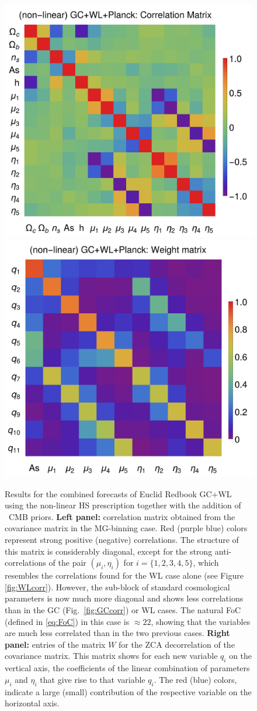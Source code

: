\begin{figure}[htbp]
	\centering
    \includegraphics[width=0.47\linewidth]{Chapters/linear-nonlinear-MG-forecasts/figures/Decorrelations-GC+WL+Planck/correlation-full-fiducialMGBin3-Euclid-GC+WL+Planck-nonlinearPk__Zhao-}
    \includegraphics[width=0.47\linewidth]{Chapters/linear-nonlinear-MG-forecasts/figures/Decorrelations-GC+WL+Planck/Weight_Matrix_ZCA_SquareNorm--_fiducialMGBin3_Euclid_GC+WL+Planck_nonlinearPk__Zhao_}
	\caption[Correlation and Weight matrix for a Euclid GC+WL forecast.]{\label{fig:GC+WL+Planck-corr-Wmat}
Results for the combined forecasts of Euclid Redbook GC+WL using the non-linear HS prescription together with the addition 
of \planck\ CMB priors.
\textbf{Left panel:} correlation matrix obtained from the covariance matrix in the MG-binning case. 
Red (purple blue) colors represent strong positive (negative) correlations. 
The structure of this matrix is considerably diagonal, except for the strong anti-correlations of the pair $(\mu_i,\eta_i)$ 
for $i=\{1,2,3,4,5\}$, which resembles the correlations found for the WL case alone (see Figure \ref{fig:WLcorr}). 
However, the sub-block of standard cosmological parameters is now  much more diagonal 
and shows less correlations than in the GC (Fig.\ \ref{fig:GCcorr}) or WL cases.
The natural FoC (defined in \ref{eq:FoC}) in this case is $\approx 22$, showing that the variables are much less correlated 
than in the two previous cases.
\textbf{Right panel:} entries of the matrix $W$ for the ZCA decorrelation of the covariance matrix. 
This matrix shows for each new variable $q_i$ on the vertical axis, the coefficients of the 
linear combination of parameters $\mu_i$ and $\eta_i$ that give rise to that variable $q_i$. 
The red (blue) colors, indicate a large (small) contribution of the respective variable on the horizontal axis.}
\end{figure}


